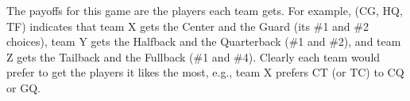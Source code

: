 \documentclass[twoside]{article}
\begin{document}
\begin{EXAM}
%
%

The payoffs for this game are the players each team gets. For example, (CG, HQ, TF) indicates that team X gets the Center and the Guard (its \#1 and \#2 choices), team Y gets the Halfback and the Quarterback (\#1 and \#2), and team Z gets the Tailback and the Fullback (\#1 and \#4). Clearly each team would prefer to get the players it likes the most, e.g., team X prefers CT (or TC) to CQ or GQ.\end{EXAM}
\end{document}
